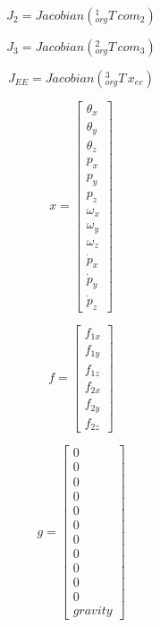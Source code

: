 \documentclass{article}
\begin{document}
\begin{equation}
	J_2 = Jacobian({}_{org}^1 T \, com_2)
\end{equation}

\begin{equation}
	J_3 = Jacobian({}_{org}^2 T \, com_3)
\end{equation}

\begin{equation}
	J_{EE} = Jacobian({}_{org}^3 T \, x_{ee})
\end{equation}

\begin{equation}
x =
 \left[\begin{matrix}\theta_{x}\\\theta_{y}\\\theta_{z}\\p_{x}\\p_{y}\\p_{z}\\\omega_{x}\\\omega_{y}\\\omega_{z}\\\dot{p}_{x}\\\dot{p}_{y}\\\dot{p}_{z}\end{matrix}\right]
 \end{equation}
 
 \begin{equation}
f =
 \left[\begin{matrix}f_{1 x}\\f_{1 y}\\f_{1 z}\\f_{2 x}\\f_{2 y}\\f_{2 z}\end{matrix}\right]
 \end{equation}
 
\begin{equation}
g =
 \left[\begin{matrix}0\\0\\0\\0\\0\\0\\0\\0\\0\\0\\0\\gravity\end{matrix}\right]
\end{equation}
\end{document}
